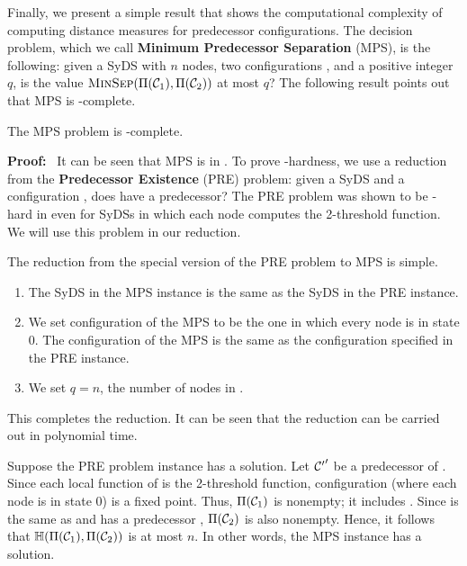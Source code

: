 \newcommand{\mps}{\mbox{MPS}}
\newcommand{\pre}{\mbox{PRE}}

\smallskip

Finally, we present a simple result that shows the computational complexity
of computing distance measures for predecessor configurations.
The decision problem, which we call \textbf{Minimum Predecessor Separation} (\mps),
is the following: given a SyDS \cals{} with $n$ nodes, two configurations \calcone,{}
\calctwo{} and a positive integer $q$, is the value 
$\mbox{\textsc{MinSep}}(\Pi(\mbox{$\mathcal{C}_{1}$}), \Pi(\mbox{$\mathcal{C}_{2}$}))$ at most $q$?
The following result points out that \mps{} is \cnp-complete.

\begin{proposition}\label{pro:minsep-hard}
The \mps{} problem is \cnp-complete.
\end{proposition}

\noindent
\textbf{Proof:}~ It can be seen that \mps{} is in \cnp.
To prove \cnp-hardness,
we use a reduction from the 
\textbf{Predecessor Existence} (\pre) problem: given a SyDS \cals{} and
a configuration \calc, does \calc{} have a predecessor?
The \pre{} problem was shown to be \cnp-hard in \cite{BH+07}
even for SyDSs in which each node computes the 2-threshold function.
We will use this problem in our reduction.

\smallskip

\noindent
The reduction from the special version of the \pre{} problem to \mps{}
is simple.
\begin{enumerate}
\item The SyDS \cals{} in the \mps{} instance is the same as the SyDS in the
\pre{} instance.
\item We set configuration \calcone{} of the \mps{} to be the one in which
every node is in state 0.
The configuration \calctwo{} of the \mps{} is the same as the configuration
\calc{} specified in the \pre{} instance.
\item We set $q = n$, the number of nodes in \cals.
\end{enumerate}
This completes the reduction. It can be seen that the reduction
can be carried out in polynomial time.

Suppose the \pre{} problem instance has a solution.
Let $\mbox{$\mathcal{C'}$}'$ be a predecessor of \calc.
Since each local function of \cals{} is the 2-threshold function,
configuration \calcone{} (where each node is in state 0) is a fixed point.
Thus, $\Pi(\mbox{$\mathcal{C}_{1}$})$ is nonempty; it includes \calcone.
Since \calctwo{} is the same as \calc{} and \calc{} has a
predecessor \calcp,  $\Pi(\mbox{$\mathcal{C}_{2}$})$ is also nonempty. 
Hence, it follows that $\mbox{$\mathbb{H}$}(\Pi(\mbox{$\mathcal{C}_{1}$}), \Pi(\mbox{$\mathcal{C}_{2}$}))$ is at most $n$.
In other words, the \mps{} instance has a solution.

